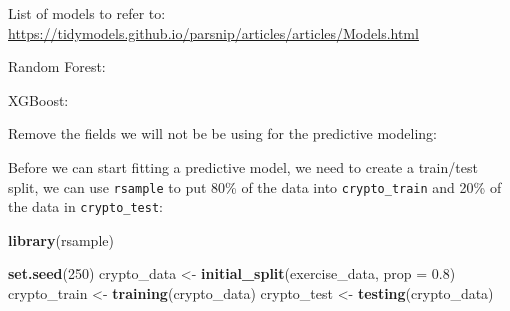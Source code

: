 \documentclass[
]{book}
\newenvironment{Shaded}{\begin{snugshade}}{\end{snugshade}}
\newcommand{\DataTypeTok}[1]{\textcolor[rgb]{0.13,0.29,0.53}{#1}}
\newcommand{\DecValTok}[1]{\textcolor[rgb]{0.00,0.00,0.81}{#1}}
\newcommand{\FloatTok}[1]{\textcolor[rgb]{0.00,0.00,0.81}{#1}}
\newcommand{\KeywordTok}[1]{\textcolor[rgb]{0.13,0.29,0.53}{\textbf{#1}}}
\newcommand{\NormalTok}[1]{#1}
\newcommand{\OperatorTok}[1]{\textcolor[rgb]{0.81,0.36,0.00}{\textbf{#1}}}
\newcommand{\StringTok}[1]{\textcolor[rgb]{0.31,0.60,0.02}{#1}}
\begin{document}
List of models to refer to: \url{https://tidymodels.github.io/parsnip/articles/articles/Models.html}

Random Forest:

\begin{Shaded}
\end{Shaded}

XGBoost:

\begin{Shaded}
\end{Shaded}

Remove the fields we will not be be using for the predictive modeling:

\begin{Shaded}
\end{Shaded}

Before we can start fitting a predictive model, we need to create a train/test split, we can use \texttt{rsample}\citep{R-rsample} to put 80\% of the data into \texttt{crypto\_train} and 20\% of the data in \texttt{crypto\_test}:

\begin{Shaded}
\begin{Highlighting}[]
\KeywordTok{library}\NormalTok{(rsample)}

\KeywordTok{set.seed}\NormalTok{(}\DecValTok{250}\NormalTok{)}
\NormalTok{crypto_data <-}\StringTok{ }\KeywordTok{initial_split}\NormalTok{(exercise_data, }\DataTypeTok{prop =} \FloatTok{0.8}\NormalTok{)}
\NormalTok{crypto_train <-}\StringTok{ }\KeywordTok{training}\NormalTok{(crypto_data)}
\NormalTok{crypto_test  <-}\StringTok{  }\KeywordTok{testing}\NormalTok{(crypto_data)}
\end{Highlighting}
\end{Shaded}
\end{document}
